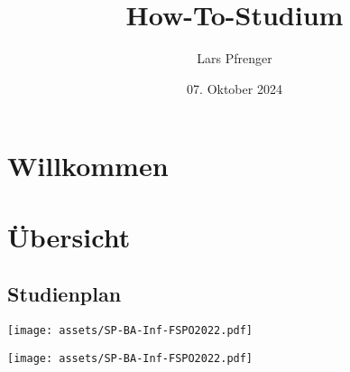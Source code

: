 \documentclass[
	aspectratio=169, 
	8pt 
]{beamer}
\title{How-To-Studium} %
\author{Lars Pfrenger} %
\date{07. Oktober 2024}
\begin{document}

\section{Willkommen}

\section{Übersicht}

\subsection{Studienplan}
\begin{frame}{\insertsubsection}
    \begin{fancycolumns}[widths={48}]
        \nextcolumn
        \texttt{[image: assets/SP-BA-Inf-FSPO2022.pdf]}
    \end{fancycolumns}
\end{frame}

\begin{frame}{\insertsubsection}
    \texttt{[image: assets/SP-BA-Inf-FSPO2022.pdf]}
\end{frame}
\end{document}
